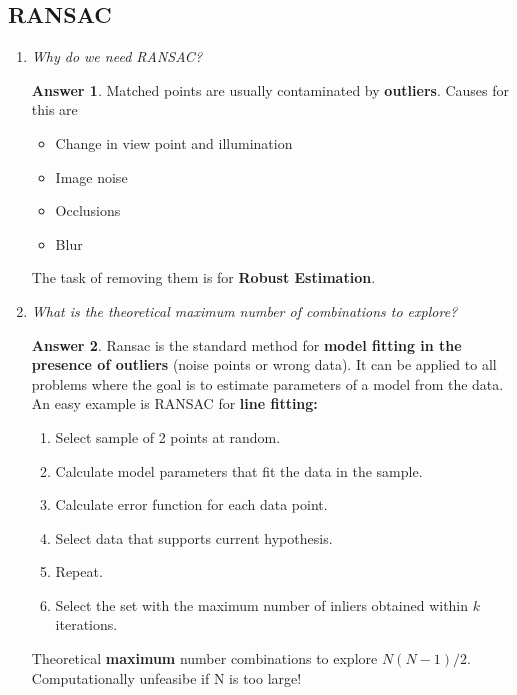 \documentclass[a4paper,12 pt]{article}
\theoremstyle{definition}
\theoremstyle{remark}
\theoremstyle{definition}
\theoremstyle{definition}
\theoremstyle{definition}
\theoremstyle{definition}
\theoremstyle{remark}
\theoremstyle{remark}
\theoremstyle{definition}
\theoremstyle{definition}
\newtheorem*{answer}{Answer}
\begin{document}
\subsection*{RANSAC}
\begin{enumerate}
\item \textit{Why do we need RANSAC?}
\begin{answer}
Matched points are usually contaminated by \textbf{outliers}. Causes for this are
\begin{itemize}
\item Change in view point and illumination
\item Image noise
\item Occlusions
\item Blur
\end{itemize}
The task of removing them is for \textbf{Robust Estimation}. 
\end{answer}
\item \textit{What is the theoretical maximum number of combinations to explore? }
\begin{answer}
Ransac is the standard method for \textbf{model fitting in the presence of outliers} (noise points or wrong data). It can be applied to all problems where the goal is to estimate parameters of a model from the data. An easy example is RANSAC for \textbf{line fitting:}
\begin{enumerate}
\item Select sample of 2 points at random.
\item Calculate model parameters that fit the data in the sample.
\item Calculate error function for each data point.
\item Select data that supports current hypothesis.
\item Repeat.
\item Select the set with the maximum number of inliers obtained within $k$ iterations.
\end{enumerate}
Theoretical \textbf{ maximum} number combinations to explore $N(N-1)/2$. Computationally unfeasibe if N is too large!
\end{answer}


\end{enumerate}
\end{document}
